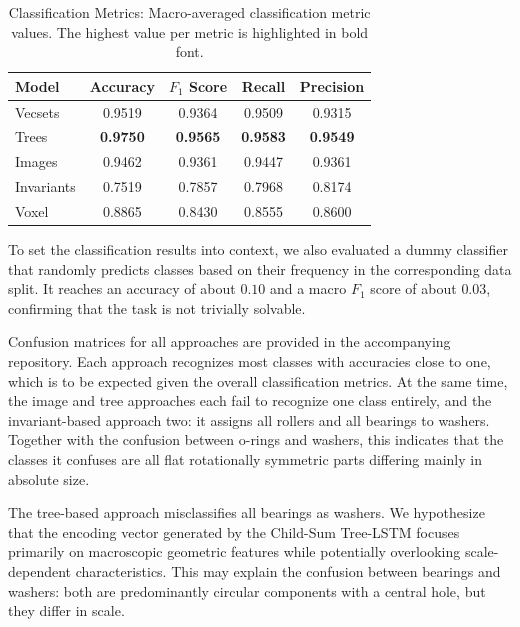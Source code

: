 \documentclass[5p,times,procedia]{elsarticle}
\begin{document}
\begin{table}[t]
\caption{Classification Metrics: Macro-averaged classification metric values. The highest value per metric is highlighted in bold font.}
\label{tab:classification-metrics}
\begin{tabular*}{\hsize}{@{\extracolsep{\fill}}lcccc@{}}
\toprule
    Model & Accuracy & $F_1$ Score & Recall & Precision \\
    \midrule
    Vecsets     & 0.9519            & 0.9364            & 0.9509            & 0.9315 \\
    Trees       & \textbf{0.9750}   & \textbf{0.9565}   & \textbf{0.9583}   & \textbf{0.9549} \\
    Images      & 0.9462            & 0.9361            & 0.9447            & 0.9361 \\
    Invariants  & 0.7519            & 0.7857            & 0.7968            & 0.8174 \\
    Voxel       & 0.8865            & 0.8430            & 0.8555            & 0.8600 \\
\bottomrule
\end{tabular*}
\end{table}

To set the classification results into context, we also evaluated a dummy classifier that randomly predicts classes based on their frequency in the corresponding data split. It reaches an accuracy of about $0.10$ and a macro $F_1$ score of about $0.03$, confirming that the task is not trivially solvable.

Confusion matrices for all approaches are provided in the accompanying repository. Each approach recognizes most classes with accuracies close to one, which is to be expected given the overall classification metrics. At the same time, the image and tree approaches each fail to recognize one class entirely, and the invariant-based approach two: it assigns all rollers and all bearings to washers. Together with the confusion between o-rings and washers, this indicates that the classes it confuses are all flat rotationally symmetric parts differing mainly in absolute size.

The tree-based approach misclassifies all bearings as washers. We hypothesize that the encoding vector generated by the Child-Sum Tree-LSTM focuses primarily on macroscopic geometric features while potentially overlooking scale-dependent characteristics. This may explain the confusion between bearings and washers: both are predominantly circular components with a central hole, but they differ in scale.
\end{document}
